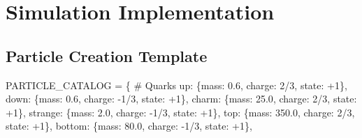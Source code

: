 \documentclass[
  11pt,
  letterpaper,
  twoside,
  openany]{book}
\makeatletter
\newenvironment{Shaded}{\begin{snugshade}}{\end{snugshade}}
\newcommand{\CommentTok}[1]{\textcolor[rgb]{0.37,0.37,0.37}{#1}}
\newcommand{\DecValTok}[1]{\textcolor[rgb]{0.68,0.00,0.00}{#1}}
\newcommand{\FloatTok}[1]{\textcolor[rgb]{0.68,0.00,0.00}{#1}}
\newcommand{\NormalTok}[1]{\textcolor[rgb]{0.00,0.23,0.31}{#1}}
\newcommand{\OperatorTok}[1]{\textcolor[rgb]{0.37,0.37,0.37}{#1}}
\newcommand{\StringTok}[1]{\textcolor[rgb]{0.13,0.47,0.30}{#1}}
\let\orig@section\section
\renewcommand{\section}{\needspace{8\baselineskip}\orig@section}
\let\orig@subsection\subsection
\renewcommand{\subsection}{\needspace{6\baselineskip}\orig@subsection}
\makeatother
\begin{document}
\section{Simulation Implementation}\label{simulation-implementation}

\subsection{Particle Creation
Template}\label{particle-creation-template}

\begin{Shaded}
\begin{Highlighting}[]
\NormalTok{PARTICLE\_CATALOG }\OperatorTok{=}\NormalTok{ \{}
    \CommentTok{\# Quarks}
    \StringTok{\textquotesingle{}up\textquotesingle{}}\NormalTok{: \{}\StringTok{\textquotesingle{}mass\textquotesingle{}}\NormalTok{: }\FloatTok{0.6}\NormalTok{, }\StringTok{\textquotesingle{}charge\textquotesingle{}}\NormalTok{: }\DecValTok{2}\OperatorTok{/}\DecValTok{3}\NormalTok{, }\StringTok{\textquotesingle{}state\textquotesingle{}}\NormalTok{: }\OperatorTok{+}\DecValTok{1}\NormalTok{\},}
    \StringTok{\textquotesingle{}down\textquotesingle{}}\NormalTok{: \{}\StringTok{\textquotesingle{}mass\textquotesingle{}}\NormalTok{: }\FloatTok{0.6}\NormalTok{, }\StringTok{\textquotesingle{}charge\textquotesingle{}}\NormalTok{: }\OperatorTok{{-}}\DecValTok{1}\OperatorTok{/}\DecValTok{3}\NormalTok{, }\StringTok{\textquotesingle{}state\textquotesingle{}}\NormalTok{: }\OperatorTok{+}\DecValTok{1}\NormalTok{\},}
    \StringTok{\textquotesingle{}charm\textquotesingle{}}\NormalTok{: \{}\StringTok{\textquotesingle{}mass\textquotesingle{}}\NormalTok{: }\FloatTok{25.0}\NormalTok{, }\StringTok{\textquotesingle{}charge\textquotesingle{}}\NormalTok{: }\DecValTok{2}\OperatorTok{/}\DecValTok{3}\NormalTok{, }\StringTok{\textquotesingle{}state\textquotesingle{}}\NormalTok{: }\OperatorTok{+}\DecValTok{1}\NormalTok{\},}
    \StringTok{\textquotesingle{}strange\textquotesingle{}}\NormalTok{: \{}\StringTok{\textquotesingle{}mass\textquotesingle{}}\NormalTok{: }\FloatTok{2.0}\NormalTok{, }\StringTok{\textquotesingle{}charge\textquotesingle{}}\NormalTok{: }\OperatorTok{{-}}\DecValTok{1}\OperatorTok{/}\DecValTok{3}\NormalTok{, }\StringTok{\textquotesingle{}state\textquotesingle{}}\NormalTok{: }\OperatorTok{+}\DecValTok{1}\NormalTok{\},}
    \StringTok{\textquotesingle{}top\textquotesingle{}}\NormalTok{: \{}\StringTok{\textquotesingle{}mass\textquotesingle{}}\NormalTok{: }\FloatTok{350.0}\NormalTok{, }\StringTok{\textquotesingle{}charge\textquotesingle{}}\NormalTok{: }\DecValTok{2}\OperatorTok{/}\DecValTok{3}\NormalTok{, }\StringTok{\textquotesingle{}state\textquotesingle{}}\NormalTok{: }\OperatorTok{+}\DecValTok{1}\NormalTok{\},}
    \StringTok{\textquotesingle{}bottom\textquotesingle{}}\NormalTok{: \{}\StringTok{\textquotesingle{}mass\textquotesingle{}}\NormalTok{: }\FloatTok{80.0}\NormalTok{, }\StringTok{\textquotesingle{}charge\textquotesingle{}}\NormalTok{: }\OperatorTok{{-}}\DecValTok{1}\OperatorTok{/}\DecValTok{3}\NormalTok{, }\StringTok{\textquotesingle{}state\textquotesingle{}}\NormalTok{: }\OperatorTok{+}\DecValTok{1}\NormalTok{\},}


\end{Highlighting}
\end{Shaded}
\end{document}

